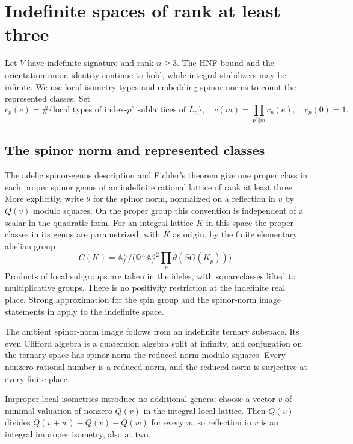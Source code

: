 \section{Indefinite spaces of rank at least three}\label{sec:indef}
Let $V$ have indefinite signature and rank $n\ge3$. The HNF
bound and the orientation-union identity continue to hold, while
integral stabilizers may be infinite. We use local isometry types
and embedding spinor norms to count the represented classes. Set
\[
 c_p(e)=\#\{\text{local types of index-}p^e\text{ sublattices of }L_p\},\quad
 c(m)=\prod_{p^e\Vert m}c_p(e),\quad c_p(0)=1 .
\]

\subsection{The spinor norm and represented classes}
The adelic spinor-genus description and Eichler's theorem give
one proper class in each proper spinor genus of an indefinite
rational lattice of rank at least three \cite[\S9.2]{SP}. More explicitly, write $\theta$ for the spinor norm, normalized on a reflection in $v$ by $Q(v)$ modulo squares. On the proper group this convention is independent of a scalar in the quadratic form. For an integral lattice $K$ in this space the proper classes in its genus are parametrized, with $K$ as origin, by the finite elementary abelian group
\begin{equation}\label{eq:spinC}
 C(K)=\mathbb A_f^\times/
 \bigl(\mathbb Q^\times\mathbb A_f^{\times2}
       \prod_p\theta(SO(K_p))\bigr).
\end{equation}
Products of local subgroups are taken in the ideles, with
squareclasses lifted to multiplicative groups. There is no positivity
restriction at the indefinite real place. Strong approximation for the spin group and the spinor-norm
image statements in \cite[\S9.2]{SP} apply to the indefinite space.

The ambient spinor-norm image follows from an indefinite ternary
subspace. Its even Clifford algebra is a quaternion algebra
split at infinity, and conjugation on the ternary space has spinor norm
the reduced norm modulo squares. Every nonzero rational number is a
reduced norm, and the reduced norm is surjective at every finite place.

Improper local isometries introduce no additional genera: choose a
vector $v$ of minimal valuation of nonzero $Q(v)$ in the integral local
lattice. Then $Q(v)$ divides $Q(v+w)-Q(v)-Q(w)$ for every $w$, so
reflection in $v$ is an integral improper isometry, also at two.


